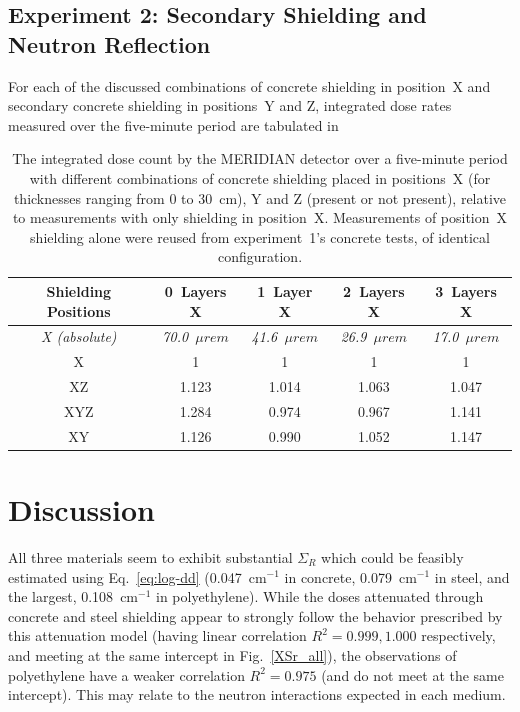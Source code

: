 \documentclass[12pt]{article}
\newcommand{\figref}[1]{Fig.~\ref{#1}}
\newcommand{\XSr}{\Sigma_R}
\newcommand{\incm}{$\mathrm{cm^{-1}}$\xspace}
\begin{document}
\FloatBarrier
\subsection{Experiment 2: Secondary Shielding and Neutron Reflection}
For each of the discussed combinations of concrete shielding in position~X and secondary concrete shielding in positions~Y and Z, integrated dose rates measured over the five-minute period are tabulated in 

\begin{table}[!htb]
    \centering\caption{The integrated dose count by the MERIDIAN detector over a five-minute period with different combinations of concrete shielding placed in positions~X (for thicknesses ranging from 0 to 30~cm), Y and Z (present or not present), relative to measurements with only shielding in position~X. Measurements of position~X shielding alone were reused from experiment~1's concrete tests, of identical configuration.}
    \label{tab:refl-counts}
    \begin{tabular}{c|cccc}
        \hline
        Shielding Positions & 0~Layers X & 1~Layer X & 2~Layers X & 3~Layers X \\\hline
        \it X (absolute) & \textit{70.0~$\mu rem$} & \textit{41.6~$\mu rem$} &\it 26.9~$\mu rem$ &\it 17.0~$\mu rem$ \\\hline
        X & 1 & 1 & 1 & 1 \\
        XZ & 1.123 & 1.014 & 1.063 & 1.047 \\
        XYZ & 1.284 & 0.974 & 0.967 & 1.141 \\
        XY & 1.126 & 0.990 & 1.052 & 1.147 \\\hline
    \end{tabular}
\end{table}
\FloatBarrier

\section{Discussion}\label{sec:disc}
All three materials seem to exhibit substantial $\XSr$ which could be feasibly estimated using Eq.~\ref{eq:log-dd} (0.047~\incm in concrete, 0.079~\incm in steel, and the largest, 0.108~\incm in polyethylene).
While the doses attenuated through concrete and steel shielding appear to strongly follow the behavior prescribed by this attenuation model (having linear correlation $R^2=0.999,1.000$ respectively, and meeting at the same intercept in \figref{XSr_all}), the observations of polyethylene have a weaker correlation $R^2=0.975$ (and do not meet at the same intercept).
This may relate to the neutron interactions expected in each medium.\\
\end{document}
